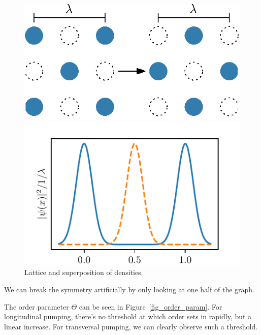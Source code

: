 \begin{figure}[!htb]
	\begin{minipage}[b]{.5\linewidth}
	\centering
	\includegraphics[width=.9\textwidth]{images/lattice_drawing.eps}
	\end{minipage}
%
	\begin{minipage}[b]{.5\linewidth}
	\centering
	\includegraphics[width=.9\textwidth]{images/density_superposition.pdf}
	\end{minipage}
\caption{Lattice and superposition of densities.}
\label{densities_superposition}
\end{figure}
\FloatBarrier

\noindent We can break the symmetry artificially by only looking at one half of the graph.

\noindent The order parameter $\Theta$ can be seen in Figure~\ref{fig_order_param}. For longitudinal pumping, there's no threshold at which order sets in rapidly, but a linear increase. For transversal pumping, we can clearly observe such a threshold.

